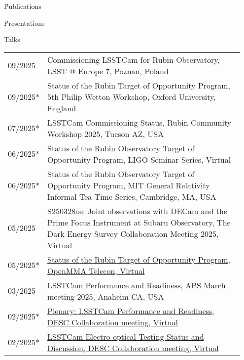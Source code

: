 \documentclass{resume} %
\begin{document}
\begin{rSection}{Publications}
\begin{rSection}{Presentations}
\begin{rSubsection}{Talks}{}{}{}
    \begin{table}[h]
\begin{tabular}{p{0.07\linewidth} p{0.88\linewidth}}
09/2025 & Commissioning LSSTCam for Rubin Observatory, LSST @ Europe 7, Poznan, Poland\\
09/2025* & Status of the Rubin Target of Opportunity Program, 5th Philip Wetton Workshop, Oxford University, England\\
07/2025* & LSSTCam Commissioning Status, Rubin Community Workshop 2025, Tucson AZ, USA\\
06/2025* & Status of the Rubin Observatory Target of Opportunity Program, LIGO Seminar Series, Virtual\\
06/2025* & Status of the Rubin Observatory Target of Opportunity Program, MIT General Relativity Informal Tea-Time Series, Cambridge, MA, USA\\
05/2025 & S250328ae: Joint observations with DECam and the Prime Focus Instrument at Subaru Observatory, The Dark Energy Survey Collaboration Meeting 2025, Virtual\\
05/2025* & \href{https://github.com/scimma/openMMA/wiki/Telecon20250522}{Status of the Rubin Target of Opportunity Program, OpenMMA Telecon, Virtual}\\
03/2025 & LSSTCam Performance and Readiness, APS March meeting 2025, Anaheim CA, USA\\
02/2025* & \href{https://docs.google.com/presentation/d/18RmTzV5id9RSE4_1xui-RJvK5FeGknrt8Ro1nBn32nk/edit?usp=sharing}{Plenary: LSSTCam Performance and Readiness, DESC Collaboration meeting, Virtual}\\
02/2025* & \href{https://docs.google.com/presentation/d/12EPsuWSixo40_oqrDPNaXstYnqDzhI_2aFL2hd7IwTE/edit#slide=id.g2ade3bc380_0_0}{LSSTCam Electro-optical Testing Status and Discussion, DESC Collaboration meeting, Virtual}\\
\end{tabular}
\end{table}
\end{rSubsection}


\end{rSection}
\end{rSection}
\end{document}
